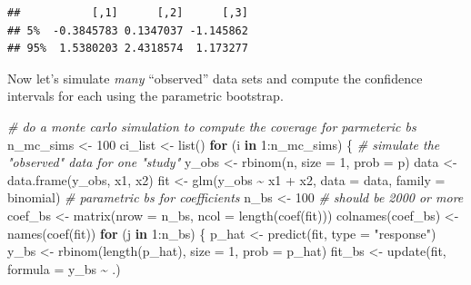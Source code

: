 \documentclass[
]{book}
\newenvironment{Shaded}{\begin{snugshade}}{\end{snugshade}}
\newcommand{\AttributeTok}[1]{\textcolor[rgb]{0.77,0.63,0.00}{#1}}
\newcommand{\CommentTok}[1]{\textcolor[rgb]{0.56,0.35,0.01}{\textit{#1}}}
\newcommand{\ControlFlowTok}[1]{\textcolor[rgb]{0.13,0.29,0.53}{\textbf{#1}}}
\newcommand{\DecValTok}[1]{\textcolor[rgb]{0.00,0.00,0.81}{#1}}
\newcommand{\FunctionTok}[1]{\textcolor[rgb]{0.00,0.00,0.00}{#1}}
\newcommand{\NormalTok}[1]{#1}
\newcommand{\OtherTok}[1]{\textcolor[rgb]{0.56,0.35,0.01}{#1}}
\newcommand{\SpecialCharTok}[1]{\textcolor[rgb]{0.00,0.00,0.00}{#1}}
\newcommand{\StringTok}[1]{\textcolor[rgb]{0.31,0.60,0.02}{#1}}
\begin{document}
\begin{verbatim}
##           [,1]      [,2]      [,3]
## 5%  -0.3845783 0.1347037 -1.145862
## 95%  1.5380203 2.4318574  1.173277
\end{verbatim}

Now let's simulate \emph{many} ``observed'' data sets and compute the
confidence intervals for each using the parametric bootstrap.

\begin{Shaded}
\begin{Highlighting}[]
\CommentTok{\# do a monte carlo simulation to compute the coverage for parmeteric bs}
\NormalTok{n\_mc\_sims }\OtherTok{\textless{}{-}} \DecValTok{100}
\NormalTok{ci\_list }\OtherTok{\textless{}{-}} \FunctionTok{list}\NormalTok{()}
\ControlFlowTok{for}\NormalTok{ (i }\ControlFlowTok{in} \DecValTok{1}\SpecialCharTok{:}\NormalTok{n\_mc\_sims) \{}
  \CommentTok{\# simulate the "observed" data for one "study"}
\NormalTok{  y\_obs }\OtherTok{\textless{}{-}} \FunctionTok{rbinom}\NormalTok{(n, }\AttributeTok{size =} \DecValTok{1}\NormalTok{, }\AttributeTok{prob =}\NormalTok{ p)}
\NormalTok{  data }\OtherTok{\textless{}{-}} \FunctionTok{data.frame}\NormalTok{(y\_obs, x1, x2)}
\NormalTok{  fit }\OtherTok{\textless{}{-}} \FunctionTok{glm}\NormalTok{(y\_obs }\SpecialCharTok{\textasciitilde{}}\NormalTok{ x1 }\SpecialCharTok{+}\NormalTok{ x2, }\AttributeTok{data =}\NormalTok{ data, }\AttributeTok{family =}\NormalTok{ binomial)}
  \CommentTok{\# parametric bs for coefficients}
\NormalTok{  n\_bs }\OtherTok{\textless{}{-}} \DecValTok{100}  \CommentTok{\# should be 2000 or more}
\NormalTok{  coef\_bs }\OtherTok{\textless{}{-}} \FunctionTok{matrix}\NormalTok{(}\AttributeTok{nrow =}\NormalTok{ n\_bs, }\AttributeTok{ncol =} \FunctionTok{length}\NormalTok{(}\FunctionTok{coef}\NormalTok{(fit)))}
  \FunctionTok{colnames}\NormalTok{(coef\_bs) }\OtherTok{\textless{}{-}} \FunctionTok{names}\NormalTok{(}\FunctionTok{coef}\NormalTok{(fit))}
  \ControlFlowTok{for}\NormalTok{ (j }\ControlFlowTok{in} \DecValTok{1}\SpecialCharTok{:}\NormalTok{n\_bs) \{}
\NormalTok{    p\_hat }\OtherTok{\textless{}{-}} \FunctionTok{predict}\NormalTok{(fit, }\AttributeTok{type =} \StringTok{"response"}\NormalTok{)}
\NormalTok{    y\_bs }\OtherTok{\textless{}{-}} \FunctionTok{rbinom}\NormalTok{(}\FunctionTok{length}\NormalTok{(p\_hat), }\AttributeTok{size =} \DecValTok{1}\NormalTok{, }\AttributeTok{prob =}\NormalTok{ p\_hat)}
\NormalTok{    fit\_bs }\OtherTok{\textless{}{-}} \FunctionTok{update}\NormalTok{(fit, }\AttributeTok{formula =}\NormalTok{ y\_bs }\SpecialCharTok{\textasciitilde{}}\NormalTok{ .)}

\end{Highlighting}
\end{Shaded}
\end{document}
